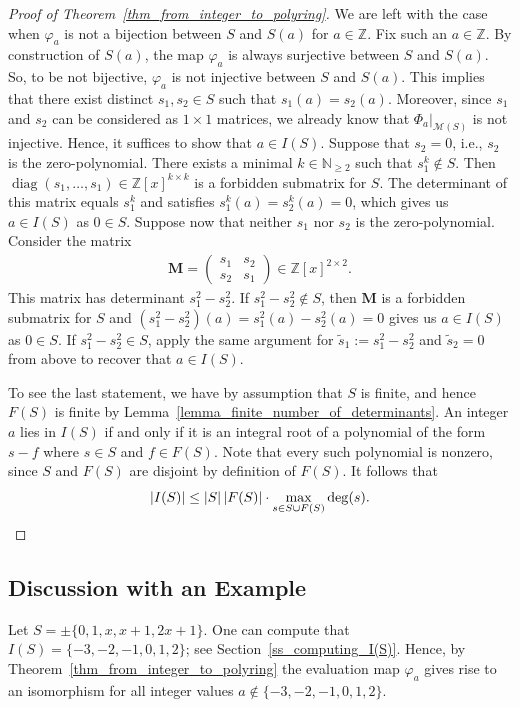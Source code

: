 \documentclass[a4paper, 11pt]{article}
\DeclareMathOperator{\diag}{diag}
\newcommand{\Z}{\mathbb{Z}}
\newcommand{\N}{\mathbb{N}}
\newcommand{\bM}{\bm{M}}
\newcommand{\indet}{x}
\newcommand{\intvar}{a}
\newcommand{\polyring}{\Z[\indet]}
\newcommand{\polyS}{S}
\newcommand{\polyM}{\bM}
\begin{document}
\begin{proof}[Proof of Theorem~\ref{thm_from_integer_to_polyring}]
		We are left with the case when $\varphi_{\intvar}$ is not a bijection between $\polyS$ and $S(\intvar)$ for $\intvar\in\Z$. Fix such an $\intvar\in\Z$. By construction of $S(\intvar)$, the map $\varphi_{\intvar}$ is always surjective between $\polyS$ and $S(\intvar)$. So, to be not bijective, $\varphi_{\intvar}$ is not injective between $\polyS$ and $S(\intvar)$. This implies that there exist distinct $s_1,s_2\in \polyS$ such that $s_1(\intvar) = s_2(\intvar)$. Moreover, since $s_1$ and $s_2$ can be considered as $1\times 1$ matrices, we already know that $\Phi_{\intvar}|_{\mathcal{M}(S)}$ is not injective. Hence, it suffices to show that $\intvar\in I(\polyS)$. Suppose that $s_2 = 0$, i.e., $s_2$ is the zero-polynomial. There exists a minimal $k\in\N_{\geq 2}$ such that $s_1^k\notin S$. Then $\diag(s_1,\ldots,s_1)\in\polyring^{k\times k}$ is a forbidden submatrix for $\polyS$. The determinant of this matrix equals $s_1^k$ and satisfies $s_1^k(\intvar) = s_2^k(\intvar) = 0$, which gives us $\intvar \in I(\polyS)$ as $0\in\polyS$. Suppose now that neither $s_1$ nor $s_2$ is the zero-polynomial. Consider the matrix
		\begin{align*}
			\polyM = \begin{pmatrix}
				s_1 & s_2 \\ 
				s_ 2 & s_1 
			\end{pmatrix}\in\polyring^{2\times 2}.
		\end{align*}
		This matrix has determinant $s_1^2 - s_2^2$. If $s_1^2-s_2^2\notin S$, then $\polyM$ is a forbidden submatrix for $\polyS$ and $(s_1^2-s_2^2)(\intvar) = s_1^2(\intvar) - s_2^2(\intvar) = 0$ gives us $\intvar \in I(\polyS)$ as $0\in \polyS$. If $s_1^2-s_2^2\in S$, apply the same argument for $\tilde{s}_1 := s_1^2-s_2^2$ and $\tilde{s}_2 = 0$ from above to recover that $\intvar \in I(\polyS)$.
		
		To see the last statement, we have by assumption that $\polyS$ is finite, and hence $F(\polyS)$ is finite by Lemma~\ref{lemma_finite_number_of_determinants}. An integer $\intvar$ lies in $I(\polyS)$ if and only if it is an integral root of a polynomial of the form $s-f$ where $s\in\polyS$ and $f\in F(\polyS)$. Note that every such polynomial is nonzero, since $\polyS$ and $F(\polyS)$ are disjoint by definition of $F(\polyS)$. It follows that
		\[
		\left| I(\polyS)\right| \leq \left|S\right|\left|F(\polyS)\right|\cdot\max_{s\in \polyS\cup F(\polyS)}\deg(s).\qedhere
		\]
	\end{proof}
	
\subsection{Discussion with an Example}
		Let $\polyS = \pm\lbrace 0,1,\indet,\indet + 1,2\indet + 1\rbrace$. One can compute that $I(\polyS) = \lbrace -3,-2,-1,0,1,2\rbrace$; see Section~\ref{ss_computing_I(S)}. Hence, by Theorem~\ref{thm_from_integer_to_polyring} the evaluation map $\varphi_{\intvar}$ gives rise to an isomorphism for all integer values $\intvar\notin\lbrace -3,-2,-1,0,1,2\rbrace$. 
		
\end{document}
